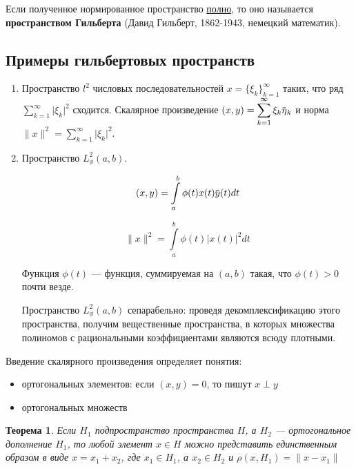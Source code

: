 \documentclass[12pt,a4paper,titlepage, oneside]{book}
\newcommand{\overbar}[1]{\mkern 1.5mu\overline{\mkern-1.5mu#1\mkern-1.5mu}\mkern 1.5mu}
\theoremstyle{definition}
\theoremstyle{plain}
\newtheorem*{theorem}{Теорема}
\theoremstyle{remark}
\theoremstyle{remark}
\theoremstyle{remark}
\theoremstyle{remark}
\theoremstyle{plain}
\theoremstyle{plain}
\begin{document}
Если полученное нормированное пространство \underline{полно}, то оно называется \textbf{пространством Гильберта} (Давид Гильберт, 1862-1943, немецкий математик).

\subsection*{Примеры гильбертовых пространств}

\begin{enumerate}
	\item Пространство $l^2$ числовых последовательностей $x = \lbrace \xi_k \rbrace_{k=1}^{\infty}$ таких, что ряд $\displaystyle\sum_{k=1}^{\infty} \lvert \xi_k \rvert^2$ сходится. Скалярное произведение $(x, y) = \displaystyle\sum_{k=1}^{\infty} \xi_k \overbar{\eta}_k$ и норма $\parallel x \parallel^2 = \displaystyle\sum_{k=1}^{\infty} \lvert \xi_k \rvert^2$.
	
	\item Пространство $L_{\phi}^2 (a, b)$.
	
	$$ (x, y) = \displaystyle\int\limits_a^b \phi(t) x(t) \overbar{y}(t) dt$$
	
	$$ \parallel x \parallel^2 = \displaystyle\int\limits_a^b \phi(t) \lvert x(t) \rvert^2 dt$$
	
	Функция $\phi(t)$ --- функция, суммируемая на $(a, b)$ такая, что $\phi(t) > 0$ почти везде.
	
	Пространство $L_{\phi}^2 (a, b)$ сепарабельно: проведя декомплексификацию этого пространства, получим вещественные пространства, в которых множества полиномов с рациональными коэффициентами являются всюду плотными.
\end{enumerate}

Введение скалярного произведения определяет понятия:

\begin{itemize}
	\item ортогональных элементов: если $(x, y) = 0$, то пишут $x \perp y$
	
	\item ортогональных множеств
\end{itemize}

\begin{theorem}
	Если $H_1$ подпространство пространства $H$, а $H_2$ --- ортогональное дополнение $H_1$, то любой элемент $x \in H$ можно представить единственным образом в виде $x = x_1 + x_2$, где $x_1 \in H_1$, а $x_2 \in H_2$ и $\rho(x, H_1) = \parallel x - x_1 \parallel$
\end{theorem}
\end{document}
